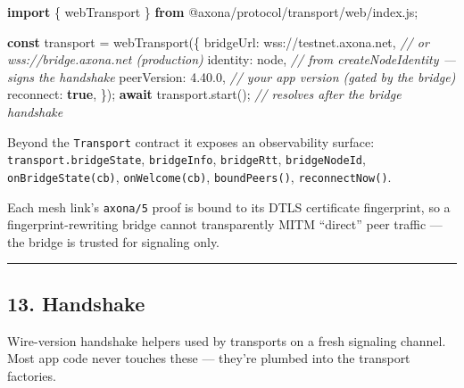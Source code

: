 \documentclass[
  nobib]{tufte-handout}
\newenvironment{Shaded}{}{}
\newcommand{\CommentTok}[1]{\textcolor[rgb]{0.38,0.63,0.69}{\textit{#1}}}
\newcommand{\ControlFlowTok}[1]{\textcolor[rgb]{0.00,0.44,0.13}{\textbf{#1}}}
\newcommand{\DataTypeTok}[1]{\textcolor[rgb]{0.56,0.13,0.00}{#1}}
\newcommand{\FunctionTok}[1]{\textcolor[rgb]{0.02,0.16,0.49}{#1}}
\newcommand{\ImportTok}[1]{\textcolor[rgb]{0.00,0.50,0.00}{\textbf{#1}}}
\newcommand{\KeywordTok}[1]{\textcolor[rgb]{0.00,0.44,0.13}{\textbf{#1}}}
\newcommand{\NormalTok}[1]{#1}
\newcommand{\OperatorTok}[1]{\textcolor[rgb]{0.40,0.40,0.40}{#1}}
\newcommand{\StringTok}[1]{\textcolor[rgb]{0.25,0.44,0.63}{#1}}
\begin{document}
\begin{Shaded}
\begin{Highlighting}[]
\ImportTok{import}\NormalTok{ \{ webTransport \} }\ImportTok{from} \StringTok{\textquotesingle{}@axona/protocol/transport/web/index.js\textquotesingle{}}\OperatorTok{;}

\KeywordTok{const}\NormalTok{ transport }\OperatorTok{=} \FunctionTok{webTransport}\NormalTok{(\{}
  \DataTypeTok{bridgeUrl}\OperatorTok{:}   \StringTok{\textquotesingle{}wss://testnet.axona.net\textquotesingle{}}\OperatorTok{,}  \CommentTok{// or wss://bridge.axona.net (production)}
  \DataTypeTok{identity}\OperatorTok{:}\NormalTok{    node}\OperatorTok{,}                       \CommentTok{// from createNodeIdentity — signs the handshake}
  \DataTypeTok{peerVersion}\OperatorTok{:} \StringTok{\textquotesingle{}4.40.0\textquotesingle{}}\OperatorTok{,}                   \CommentTok{// your app version (gated by the bridge)}
  \DataTypeTok{reconnect}\OperatorTok{:}   \KeywordTok{true}\OperatorTok{,}
\NormalTok{\})}\OperatorTok{;}
\ControlFlowTok{await}\NormalTok{ transport}\OperatorTok{.}\FunctionTok{start}\NormalTok{()}\OperatorTok{;}                  \CommentTok{// resolves after the bridge handshake}
\end{Highlighting}
\end{Shaded}

Beyond the \texttt{Transport} contract it exposes an observability
surface: \texttt{transport.bridgeState}, \texttt{bridgeInfo},
\texttt{bridgeRtt}, \texttt{bridgeNodeId}, \texttt{onBridgeState(cb)},
\texttt{onWelcome(cb)}, \texttt{boundPeers()}, \texttt{reconnectNow()}.

Each mesh link's \texttt{axona/5} proof is bound to its DTLS certificate
fingerprint, so a fingerprint-rewriting bridge cannot transparently MITM
``direct'' peer traffic --- the bridge is trusted for signaling only.

\begin{center}\rule{0.5\linewidth}{0.5pt}\end{center}

\subsection{13. Handshake}\label{handshake}

Wire-version handshake helpers used by transports on a fresh signaling
channel. Most app code never touches these --- they're plumbed into the
transport factories.
\end{document}

